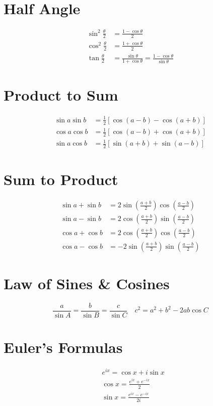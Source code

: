 \documentclass[fleqn, a4paper,10pt]{article}
\begin{document}
\begin{multicols}{2}
\section*{Half Angle}
\[
\begin{aligned}
\sin^2\frac{\theta}{2} &= \frac{1 - \cos\theta}{2} \\
\cos^2\frac{\theta}{2} &= \frac{1 + \cos\theta}{2} \\
\tan\frac{\theta}{2} &= \frac{\sin\theta}{1 + \cos\theta} = \frac{1 - \cos\theta}{\sin\theta}
\end{aligned}
\]

\section*{Product to Sum}
\[
\begin{aligned}
\sin a \sin b &= \frac{1}{2}[\cos(a-b) - \cos(a+b)] \\
\cos a \cos b &= \frac{1}{2}[\cos(a-b) + \cos(a+b)] \\
\sin a \cos b &= \frac{1}{2}[\sin(a+b) + \sin(a-b)]
\end{aligned}
\]

\section*{Sum to Product}
\[
\begin{aligned}
\sin a + \sin b &= 2\sin\left(\frac{a+b}{2}\right)\cos\left(\frac{a-b}{2}\right) \\
\sin a - \sin b &= 2\cos\left(\frac{a+b}{2}\right)\sin\left(\frac{a-b}{2}\right) \\
\cos a + \cos b &= 2\cos\left(\frac{a+b}{2}\right)\cos\left(\frac{a-b}{2}\right) \\
\cos a - \cos b &= -2\sin\left(\frac{a+b}{2}\right)\sin\left(\frac{a-b}{2}\right)
\end{aligned}
\]

\section*{Law of Sines \& Cosines}
\[
\frac{a}{\sin A} = \frac{b}{\sin B} = \frac{c}{\sin C}
\quad
c^2 = a^2 + b^2 - 2ab\cos C
\]

\section*{Euler's Formulas}
\[
\begin{aligned}
&e^{ix} = \cos x + i\sin x \\
&\cos x = \frac{e^{ix} + e^{-ix}}{2} \\
&\sin x = \frac{e^{ix} - e^{-ix}}{2i}
\end{aligned}
\]

\end{multicols}
\end{document}
